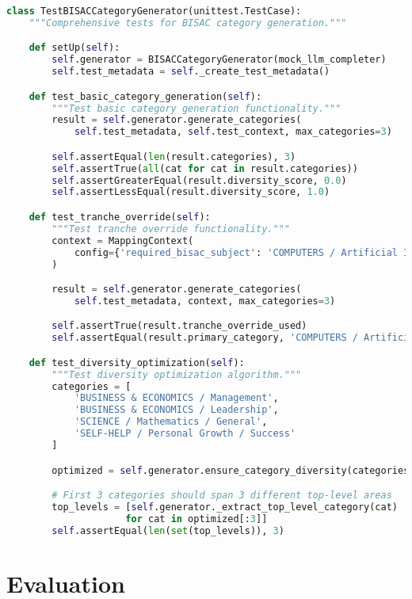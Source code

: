 \documentclass{article}
\begin{document}
\begin{lstlisting}[language=python, caption=Testing Framework]
class TestBISACCategoryGenerator(unittest.TestCase):
    """Comprehensive tests for BISAC category generation."""

    def setUp(self):
        self.generator = BISACCategoryGenerator(mock_llm_completer)
        self.test_metadata = self._create_test_metadata()

    def test_basic_category_generation(self):
        """Test basic category generation functionality."""
        result = self.generator.generate_categories(
            self.test_metadata, self.test_context, max_categories=3)

        self.assertEqual(len(result.categories), 3)
        self.assertTrue(all(cat for cat in result.categories))
        self.assertGreaterEqual(result.diversity_score, 0.0)
        self.assertLessEqual(result.diversity_score, 1.0)

    def test_tranche_override(self):
        """Test tranche override functionality."""
        context = MappingContext(
            config={'required_bisac_subject': 'COMPUTERS / Artificial Intelligence'}
        )

        result = self.generator.generate_categories(
            self.test_metadata, context, max_categories=3)

        self.assertTrue(result.tranche_override_used)
        self.assertEqual(result.primary_category, 'COMPUTERS / Artificial Intelligence')

    def test_diversity_optimization(self):
        """Test diversity optimization algorithm."""
        categories = [
            'BUSINESS & ECONOMICS / Management',
            'BUSINESS & ECONOMICS / Leadership',
            'SCIENCE / Mathematics / General',
            'SELF-HELP / Personal Growth / Success'
        ]

        optimized = self.generator.ensure_category_diversity(categories)

        # First 3 categories should span 3 different top-level areas
        top_levels = [self.generator._extract_top_level_category(cat)
                     for cat in optimized[:3]]
        self.assertEqual(len(set(top_levels)), 3)
\end{lstlisting}

\section{Evaluation}
\label{sec:evaluation}
\end{document}
